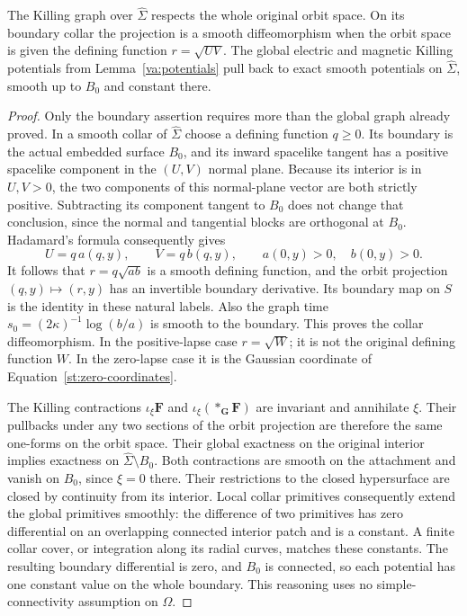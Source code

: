 \begin{lemma}\label{st:maximal-boundary-graph}
The Killing graph over $\widehat\Sigma$ respects the whole original
orbit space.  On its boundary collar the projection is a smooth
diffeomorphism when the orbit space is given the defining function
$r=\sqrt{UV}$.  The global electric and magnetic Killing
potentials from Lemma~\ref{va:potentials} pull back to exact
smooth potentials on $\widehat\Sigma$, smooth up to $B_0$ and
constant there.
\end{lemma}

\begin{proof}
Only the boundary assertion requires more than the global graph
already proved.  In a smooth collar of $\widehat\Sigma$ choose
a defining function $q\geq0$.  Its boundary is the actual embedded
surface $B_0$, and its inward spacelike tangent has a positive
spacelike component in the $(U,V)$ normal plane.  Because its
interior is in $U,V>0$, the two components of this normal-plane
vector are both strictly positive.  Subtracting its component
tangent to $B_0$ does not change that conclusion, since the
normal and tangential blocks are orthogonal at $B_0$.
Hadamard's formula consequently gives
\[
 U=q\,a(q,y),\qquad V=q\,b(q,y),
 \qquad a(0,y)>0,\quad b(0,y)>0.
\]
It follows that $r=q\sqrt{ab}$ is a smooth defining function,
and the orbit projection $(q,y)\mapsto(r,y)$ has an invertible
boundary derivative.  Its boundary map on $S$ is the identity
in these natural labels.  Also the graph time
$s_0=(2\kappa)^{-1}\log(b/a)$ is smooth to the boundary.
This proves the collar diffeomorphism.  In the positive-lapse
case $r=\sqrt W$; it is not the original defining function $W$.
In the zero-lapse case it is the Gaussian coordinate of
Equation~\eqref{st:zero-coordinates}.

The Killing contractions $\iota_\xi\mathbf F$ and
$\iota_\xi(*_{\mathbf G}\mathbf F)$ are invariant and annihilate
$\xi$.  Their pullbacks under any two sections of the orbit
projection are therefore the same one-forms on the orbit space.
Their global exactness on the original interior implies exactness
on $\widehat\Sigma\setminus B_0$.  Both contractions are smooth
on the attachment and vanish on $B_0$, since $\xi=0$ there.
Their restrictions to the closed hypersurface are closed by
continuity from its interior.  Local collar primitives consequently
extend the global primitives smoothly: the difference of two
primitives has zero differential on an overlapping connected
interior patch and is a constant.  A finite collar cover, or
integration along its radial curves, matches these constants.
The resulting boundary differential is zero, and $B_0$ is
connected, so each potential has one constant value on the whole
boundary.  This reasoning uses no simple-connectivity assumption
on $\Omega$.
\end{proof}
